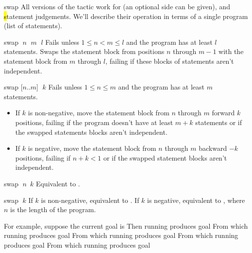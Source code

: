 \begin{tactic}{swap}
All versions of the tactic work for \prhl (an optional side can be given),
\phl and \hl statement judgements. We'll describe their operation
in terms of a single program (list of statements).

\medskip
\begin{tsyntax}{swap $\;n$ $\;m$ $\;l$}
  Fails unless $1\leq n < m \leq l$ and the program has at least $l$
  statements. Swaps the statement block from positions $n$ through
  $m-1$ with the statement block from $m$ through $l$, failing if these
  blocks of statements aren't independent.
\end{tsyntax}

\begin{tsyntax}{swap [$n$..$m$] $\;k$}
  Fails unless $1\leq n \leq m$ and the program has at
  least $m$ statements.
  \begin{itemize}
  \item If $k$ is non-negative, move the statement block from $n$
    through $m$ forward $k$ positions, failing if the program doesn't
    have at least $m + k$ statements or if the swapped statements
    blocks aren't independent.

  \item If $k$ is negative, move the statement block from $n$ through
    $m$ backward $-k$ positions, failing if $n + k < 1$ or if the
    swapped statement blocks aren't independent.
  \end{itemize}
\end{tsyntax}

\begin{tsyntax}{swap $\;n$\ $k$}
  Equivalent to .
\end{tsyntax}

\begin{tsyntax}{swap $\;k$}
  If $k$ is non-negative, equivalent to .
  If $k$ is negative, equivalent to ,
  where $n$ is the length of the program.
\end{tsyntax}

\medskip For example, suppose the current goal is
  Then running
  produces goal
  From which running
  produces goal
  From which running
  produces goal
  From which running
  produces goal
  From which running
  produces goal
\end{tactic}

